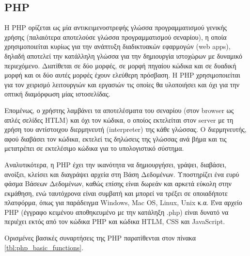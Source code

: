 \subsection{PHP}
Η PHP ορίζεται ως μία αντικειμενοστρεφής γλώσσα προγραμματισμού γενικής χρήσης (παλαιότερα αποτελούσε γλώσσα προγραμματισμού σεναρίου), η οποία χρησιμοποιείται κυρίως για την ανάπτυξη διαδικτυακών εφαρμογών (web apps), δηλαδή αποτελεί την κατάλληλη γλώσσα για την δημιουργία ιστοχώρων με δυναμικό περιεχόμενο. Διατίθεται σε δύο μορφές, σε μορφή πηγαίου κώδικα και σε δυαδική μορφή και οι δύο αυτές μορφές έχουν ελεύθερη πρόσβαση. Η PHP χρησιμοποιείται για τον χειρισμό λειτουργιών και εργασιών τις οποίες θα υλοποιήσει και όχι για την οπτική διαμόρφωση μίας ιστοσελίδας.

Επομένως, ο χρήστης λαμβάνει τα αποτελέσματα του σεναρίου (στον browser ως απλές σελίδες HTLM) και όχι τον κώδικα, ο οποίος εκτελείται στον server με τη χρήση του αντίστοιχου διερμηνευτή (interpreter) της κάθε γλώσσας. Ο διερμηνευτής, αφού διαβάσει τον κώδικα, εκτελεί τις δηλώσεις της γλώσσας ανά βήμα και τις μετατρέπει σε εκτελέσιμο κώδικα για το υπολογιστικό σύστημα.

Αναλυτικότερα, η PHP έχει την ικανότητα να δημιουργήσει, γράψει, διαβάσει, ανοίξει, κλείσει και διαγράψει αρχεία στη Βάση Δεδομένων. Υποστηρίζει ένα ευρύ φάσμα Βάσεων Δεδομένων, καθώς επίσης είναι δωρεάν και αρκετά εύκολη στην εκμάθηση, ενώ ταυτόχρονα είναι συμβατή και μπορεί να τρέξει σε οποιαδήποτε πλατφόρμα, όπως για παράδειγμα Windows, Mac OS, Linux, Unix κ.α. Ένα αρχείο PHP (έγγραφο κειμένου αποθηκευμένο με την κατάληξη .php) είναι δυνατό να περιέχει εκτός από τον κώδικα PHP και κώδικα HTLM, CSS και JavaScript.

Ορισμένες βασικές συναρτήσεις της PHP παρατίθενται στον πίνακα \ref{tbl:php_basic_functions}.

